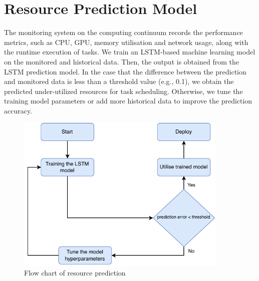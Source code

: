         
    \section{Resource Prediction Model}
    \label{sec:resource-prediction-model}

        The monitoring system on the computing continuum records the performance metrics, such as CPU, GPU, memory utilisation and network usage, along with the runtime execution of tasks. We train an LSTM-based machine learning model on the monitored and historical data. Then, the output is obtained from the LSTM prediction model. In the case that the difference between the prediction and monitored data is less than a threshold value (e.g., 0.1), we obtain the predicted under-utilized resources for task scheduling. Otherwise, we tune the training model parameters or add more historical data to improve the prediction accuracy.


        \begin{figure}
            \centering
            \includegraphics[width=0.9\textwidth]{figures/training_flowchart.pdf}
            \caption{Flow chart of resource prediction}
            \label{fig:flow-chart-of-resource-prediction}
        \end{figure}



        